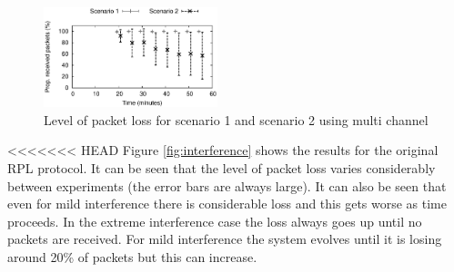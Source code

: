 \begin{figure}
\centering
\includegraphics[width=0.45\textwidth]{experiments/multi_channel.eps}
\caption{Level of packet loss for scenario 1 and scenario 2 using multi channel}
\label{fig:multi_interference}
\end{figure}

<<<<<<< HEAD
Figure \ref{fig:interference} shows the results for the original RPL protocol.
It can be seen that the level of packet loss varies considerably between experiments
(the error bars are always large).  It can also be seen that even for mild 
interference there is considerable loss and this gets worse as time proceeds.
In the extreme interference case the loss always goes up until no packets are received.
For mild interference the system evolves until it is losing around 20\% of
packets but this can increase.

